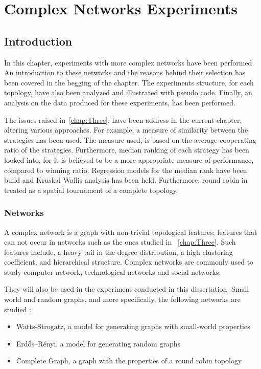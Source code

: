 \chapter{Complex Networks Experiments}
\label{chap:Four}

\section{Introduction}
In this chapter, experiments with more complex networks have been performed.
An introduction to these networks and the reasons behind their selection has been
covered in the begging of the chapter. The experiments structure, for each topology,
have also been analyzed and illustrated with pseudo code. Finally, an analysis on
the data produced for these experiments, has been performed.

The issues raised in~\ref{chap:Three}, have been address in the current chapter,
altering various approaches. For example, a measure of similarity between the
strategies has been used. The measure used, is based on the average cooperating
ratio of the strategies. Furthermore, median ranking of each strategy has been
looked into, for it is believed to be a more appropriate measure of performance,
compared to winning ratio. Regression models for the median rank have been build
and Kruskal Wallis analysis has been held. Furthermore, round robin in treated as
a spatial tournament of a complete topology.

\subsection{Networks}

A complex network is a graph with non-trivial topological features;
features that can not occur in networks such as the ones studied in ~\ref{chap:Three}.
Such features include, a heavy tail in the degree distribution, a high
clustering coefficient, and hierarchical structure. Complex networks are commonly
used to study computer network, technological networks and social networks.

They will also be used in the experiment conducted in this dissertation. Small
world and random graphs, and more specifically, the following networks are
studied :

\begin{itemize}
	\item Watts-Strogatz, a model for generating graphs with small-world properties
	\item Erdős–Rényi, a model for generating random graphs
	\item Complete Graph, a graph with the properties of a round robin topology
\end{itemize}

